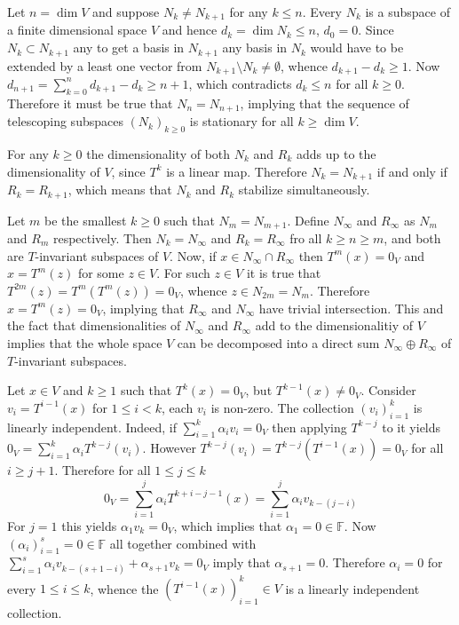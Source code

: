 \documentclass[a4paper]{article}
\newcommand{\brac}[1]{{\left({#1}\right)}}
\begin{document}
Let $n=\dim{V}$ and suppose $N_k\neq N_{k+1}$ for any $k\leq n$. Every $N_k$ is a subspace of a finite dimensional space $V$ and hence $d_k = \dim{N_k}\leq n$, $d_0 = 0$. Since $N_k\subset N_{k+1}$ any to get a basis in $N_{k+1}$ any basis in $N_k$ would have to be extended by a least one vector from $N_{k+1}\setminus N_k\neq \emptyset$, whence $d_{k+1}-d_k\geq 1$. Now $d_{n+1} = \sum_{k=0}^n{d_{k+1}-d_k} \geq n+1$, which contradicts $d_k\leq n$ for all $k\geq 0$. Therefore it must be true that $N_n=N_{n+1}$, implying that the sequence of telescoping subspaces $\brac{N_k}_{k\geq 0}$ is stationary for all $k\geq \dim{V}$.

For any $k\geq 0$ the dimensionality of both $N_k$ and $R_k$ adds up to the dimensionality of $V$, since $T^k$ is a linear map. Therefore $N_k=N_{k+1}$ if and only if $R_k=R_{k+1}$, which means that $N_k$ and $R_k$ stabilize simultaneously.

Let $m$ be the smallest $k\geq 0$ such that $N_m = N_{m+1}$. Define $N_\infty$ and $R_\infty$ as $N_m$ and $R_m$ respectively. Then $N_k=N_\infty$ and $R_k=R_\infty$ fro all $k\geq n \geq m$, and both are $T$-invariant subspaces of $V$. Now, if $x\in N_\infty\cap R_\infty$ then $T^m(x) = 0_V$ and $x=T^m(z)$ for some $z\in V$. For such $z\in V$ it is true that $T^{2m}(z) = T^m\brac{T^m(z)} = 0_V$, whence $z\in N_{2m} = N_m$. Therefore $x=T^m(z)=0_V$, implying that $R_\infty$ and $N_\infty$ have trivial intersection. This and the fact that dimensionalities of $N_\infty$ and $R_\infty$ add to the dimensionalitiy of $V$ implies that the whole space $V$ can be decomposed into a direct sum $N_\infty\oplus R_\infty$ of $T$-invariant subspaces.

Let $x\in V$ and $k\geq 1$ such that $T^k(x) = 0_V$, but $T^{k-1}(x)\neq 0_V$. Consider $v_i = T^{i-1}(x)$ for $1\leq i < k$, each $v_i$ is non-zero. The collection $\brac{v_i}_{i=1}^k$ is linearly independent. Indeed, if $\sum_{i=1}^k \alpha_i v_i = 0_V$ then applying $T^{k-j}$ to it yields $0_V = \sum_{i=1}^k \alpha_i T^{k-j}(v_i)$. However $T^{k-j}(v_i) = T^{k-j}\brac{T^{i-1}(x)} = 0_V$ for all $i\geq j+1$. Therefore for all $1\leq j \leq k$ \[0_V = \sum_{i=1}^j \alpha_i T^{k+i-j-1}(x)=\sum_{i=1}^j \alpha_i v_{k-(j-i)}\] For $j=1$ this yields $\alpha_1 v_k = 0_V$, which implies that $\alpha_1 = 0\in \mathbb{F}$. Now $\brac{\alpha_i}_{i=1}^s=0\in \mathbb{F}$ all together combined with $\sum_{i=1}^s \alpha_i v_{k-(s+1-i)} + \alpha_{s+1} v_k = 0_V$ imply that $\alpha_{s+1}=0$. Therefore $\alpha_i = 0$ for every $1\leq i\leq k$, whence the $\brac{T^{i-1}(x)}_{i=1}^k \in V$ is a linearly independent collection.
\end{document}
